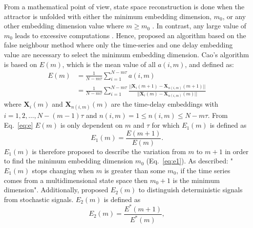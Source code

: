 From a mathematical point of view, state space reconstruction is done when 
the attractor is unfolded with either the minimum embedding dimension, $m_0$, 
or any other embedding dimension value where $m \ge m_0$ \citep{kennel1992}.
In contrast, any large value of $m_0$ leads to excessive computations 
\citep{bradley2015}. Hence, \cite{Cao1997} proposed an algorithm based on the
false neighbour method where only the time-series and one delay embedding value 
are necessary to select the minimum embedding dimension. 
Cao's algorithm is based on $E(m)$, which is the mean value of all $a(i,m)$,
and defined as: 
\begin{equation}\label{eq:e}
  \begin{aligned}
E(m) &= \frac{1}{N-m\tau} \sum_{i=1}^{N-m\tau} a(i,m) \\
    &=
       \frac{1}{N-m\tau} \sum_{i=1}^{N-m\tau}
       \frac{ || \boldsymbol{X}_i(m+1) - \boldsymbol{X}_{n(i,m)}(m+1) || }
            { || \boldsymbol{X}_i(m) - \boldsymbol{X}_{n(i,m)}(m) ||  }
  \end{aligned}
\end{equation}
where $\boldsymbol{X}_i(m)$ and $\boldsymbol{X}_{n(i,m)}(m)$ are the time-delay
embeddings with $i=1,2,\dots,N-(m-1)\tau$ and 
$ n(i,m)= 1 \le n(i,m) \le N-m\tau$.
From Eq.~\ref{eq:e} $E(m)$ is only dependent on $m$ and $\tau$ for which 
$E_1(m)$ is defined as
\begin{equation}\label{eq:e1}
E_1(m) = \frac{ E(m+1) } { E(m)}.
\end{equation}
$E_1(m)$ is therefore proposed to describe the variation from $m$ to $m+1$
in order to find the minimum embedding dimension $m_0$ (Eq.~\ref{eq:e1}).
As \citealt[p. 44]{Cao1997} described: "$E_1(m)$ stops changing when $m$ is 
greater than some $m_0$, if the time series comes from a multidimensional 
state space then $m_0 + 1$ is the minimum dimension".
Additionally, \cite{Cao1997} proposed $E_2(m)$ to distinguish deterministic 
signals from stochastic signals. $E_2(m)$ is defined as
\begin{equation}\label{eq:e2}
E_2(m) = \frac{ E^* (m+1) } { E^*(m)},
\end{equation}
